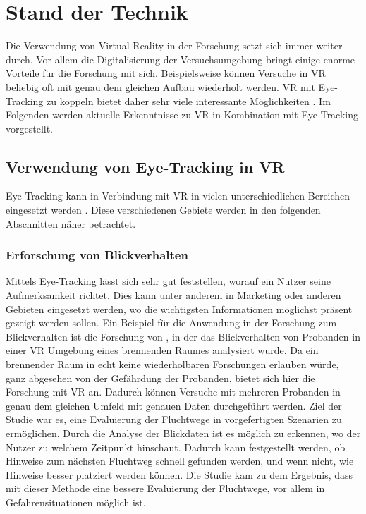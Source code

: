 
\chapter{Stand der Technik}
Die Verwendung von Virtual Reality in der Forschung setzt sich immer weiter durch. Vor allem die Digitalisierung der Versuchsumgebung bringt einige enorme Vorteile für die Forschung mit sich. Beispielsweise können Versuche in VR beliebig oft mit genau dem gleichen Aufbau wiederholt werden. VR mit Eye-Tracking zu koppeln bietet daher sehr viele interessante Möglichkeiten \cite{Clay_Koenig_Koenig_2019}. Im Folgenden werden aktuelle Erkenntnisse zu VR in Kombination mit Eye-Tracking vorgestellt.

\section{Verwendung von Eye-Tracking in VR}
Eye-Tracking kann in Verbindung mit VR in vielen unterschiedlichen Bereichen eingesetzt werden \cite{Clay_Koenig_Koenig_2019}. Diese verschiedenen Gebiete werden in den folgenden Abschnitten näher betrachtet.
\subsection{Erforschung von Blickverhalten}
Mittels Eye-Tracking lässt sich sehr gut feststellen, worauf ein Nutzer seine Aufmerksamkeit richtet. Dies kann unter anderem in Marketing \cite{C.Wang.2019} oder anderen Gebieten eingesetzt werden, wo die wichtigsten Informationen möglichst präsent gezeigt werden sollen. 
Ein Beispiel für die Anwendung in der Forschung zum Blickverhalten ist die Forschung von \citeauthor{P.Tian.2019}, in der das Blickverhalten von Probanden in einer VR Umgebung eines brennenden Raumes analysiert wurde. Da ein brennender Raum in echt keine wiederholbaren Forschungen erlauben würde, ganz abgesehen von der Gefährdung der Probanden, bietet sich hier die Forschung mit VR an. Dadurch können Versuche mit mehreren Probanden in genau dem gleichen Umfeld mit genauen Daten durchgeführt werden. Ziel der Studie war es, eine Evaluierung der Fluchtwege in vorgefertigten Szenarien zu ermöglichen. Durch die Analyse der Blickdaten ist es möglich zu erkennen, wo der Nutzer zu welchem Zeitpunkt hinschaut. Dadurch kann festgestellt werden, ob Hinweise zum nächsten Fluchtweg schnell gefunden werden, und wenn nicht, wie Hinweise besser platziert werden können. Die Studie kam zu dem Ergebnis, dass mit dieser Methode eine bessere Evaluierung der Fluchtwege, vor allem in Gefahrensituationen möglich ist.\cite{P.Tian.2019}

